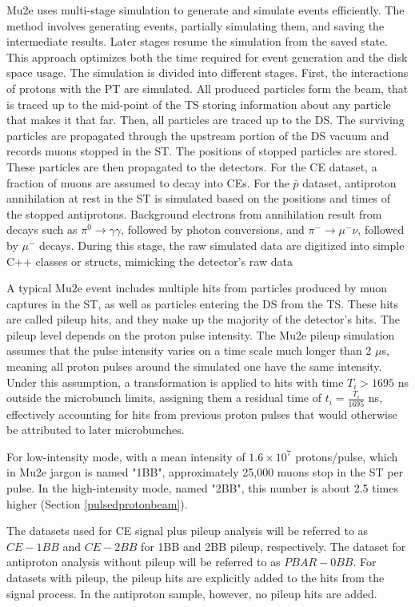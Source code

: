 Mu2e uses multi-stage simulation to generate and simulate events efficiently. 
The method involves generating events, partially simulating 
them, and saving the intermediate results. Later stages resume the simulation from the saved 
state. This approach optimizes both the time required for event generation 
and the disk space usage. The simulation is divided into different stages. 
First, the interactions of protons with the PT are simulated.
All produced particles form the beam, that is traced up to the mid-point of the
TS storing information about any particle that makes it that far. Then, all particles are  
traced up to the DS. The surviving particles are propagated through the upstream portion of
the DS vacuum and records muons stopped in the ST. The positions of stopped particles are stored. 
These particles are then propagated to the detectors. 
For the CE dataset, a fraction of muons are assumed to decay into CEs. For the $\bar{p}$ dataset, 
antiproton annihilation at rest in the ST is simulated based on the positions 
and times of the stopped antiprotons. Background electrons from annihilation 
result from decays such as $\pi^0 \to \gamma \gamma$, followed by photon conversions, and $\pi^- \to \mu^- \nu$, 
followed by $\mu^-$ decays. During this stage, the raw simulated data are digitized 
into simple C++ classes or structs, mimicking the detector's raw data

A typical Mu2e event includes multiple hits from particles produced 
by muon captures in the ST, as well as particles entering the DS from 
the TS. These hits are called pileup hits, and they make 
up the majority of the detector's hits. The pileup level 
depends on the proton pulse intensity. The Mu2e pileup 
simulation assumes that the pulse intensity varies on a 
time scale much longer than 2 $\mu$s, meaning all proton 
pulses around the simulated one have the same intensity. 
Under this assumption, a transformation is applied to hits 
with time $T_i > 1695$ ns outside the microbunch limits, 
assigning them a residual time of $t_i = \frac{T_i}{1695}$ ns, 
effectively accounting for hits from previous proton pulses 
that would otherwise be attributed to later microbunches.

For low-intensity mode, with a mean intensity of 
$1.6 \times 10^7$ protons/pulse, which in Mu2e 
jargon is named "1BB", approximately 25,000 
muons stop in the ST per pulse. In the high-intensity 
mode, named "2BB", this number is about 2.5 times higher (Section \ref{pulsedprotonbeam}).

The datasets used for CE signal plus pileup 
analysis will be referred to as $CE-1BB$ and $CE-2BB$ 
for 1BB and 2BB pileup, respectively. The dataset for 
antiproton analysis without pileup will be 
referred to as $PBAR-0BB$.
For datasets with pileup, 
the pileup hits are explicitly added to the hits from 
the signal process. In the antiproton sample, however, 
no pileup hits are added. 
